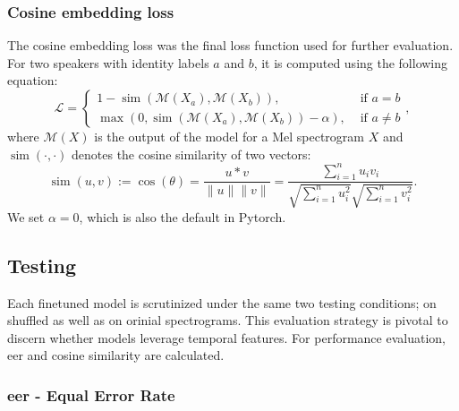 \subsubsection{Cosine embedding loss}

The cosine embedding loss was the final loss function used for further evaluation. For two speakers with identity labels $a$ and $b$, it is computed using the following equation:
\begin{equation}
 \mathcal{L}= \begin{cases}1 - \operatorname{sim} \left(\mathcal{M}(X_a), \mathcal{M}(X_b)\right), & \text { if } a = b \\ \max \left(0, \operatorname{sim} \left(\mathcal{M}(X_a), \mathcal{M}(X_b)\right)-\alpha\right), & \text { if } a \neq b \end{cases},
\end{equation}
where $\mathcal{M}(X)$ is the output of the model for a Mel spectrogram $X$ and $\operatorname{sim}(\cdot, \cdot)$ denotes the cosine similarity of two vectors:
\begin{equation}
\operatorname{sim}(u, v) := \cos(\theta) = \frac{u * v}{\|u\| \|v\|}=\frac{\sum_{i=1}^n u_i v_i}{\sqrt{\sum_{i=1}^n u_i^2} \sqrt{\sum_{i=1}^n v_i^2}}.
\end{equation}
We set $\alpha=0$, which is also the default in Pytorch.




\subsection{Testing}

Each finetuned model is scrutinized under the same two testing conditions; on shuffled as well as on orinial spectrograms. This evaluation strategy is pivotal to discern whether models leverage temporal features. For performance evaluation, \gls{eer} and cosine similarity are calculated.

\subsubsection{\gls{eer} - Equal Error Rate}

